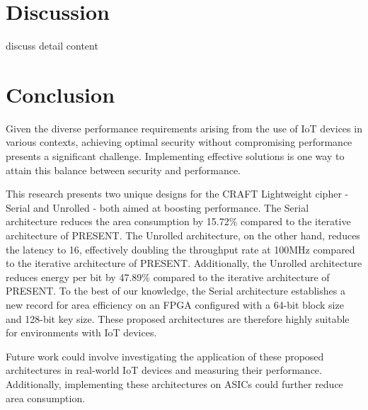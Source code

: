 \documentclass[final,5p,times,twocolumn]{elsarticle}
\begin{document}
\section{Discussion}\label{discussion_sec}
\color{blue}
discuss detail content
\color{black}

\section{Conclusion}\label{sec6}

Given the diverse performance requirements arising from the use of IoT devices in various contexts, achieving optimal security without compromising performance presents a significant challenge. Implementing effective solutions is one way to attain this balance between security and performance.

This research presents two unique designs for the CRAFT Lightweight cipher - Serial and Unrolled - both aimed at boosting performance.
The Serial architecture reduces the area consumption by 15.72\% compared to the iterative architecture of PRESENT.
The Unrolled architecture, on the other hand, reduces the latency to 16, effectively doubling the throughput rate at 100MHz compared to the iterative architecture of PRESENT.
Additionally, the Unrolled architecture reduces energy per bit by 47.89\% compared to the iterative architecture of PRESENT.
To the best of our knowledge, the Serial architecture establishes a new record for area efficiency on an FPGA configured with a 64-bit block size and 128-bit key size.
These proposed architectures are therefore highly suitable for environments with IoT devices.

Future work could involve investigating the application of these proposed architectures in real-world IoT devices and measuring their performance. Additionally, implementing these architectures on ASICs could further reduce area consumption.



\end{document}
